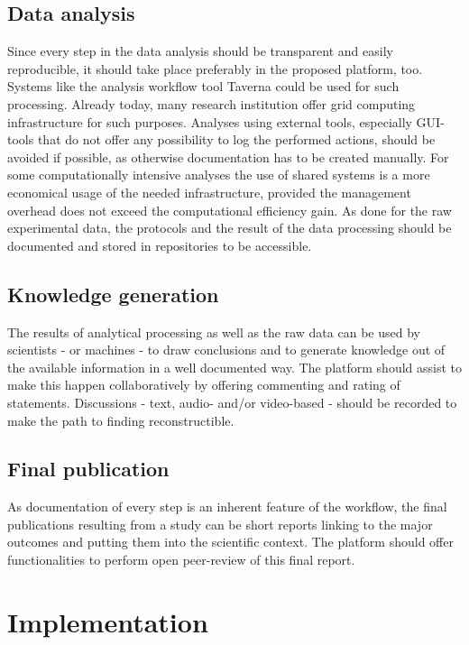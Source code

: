 \documentclass{article}
\begin{document}
\subsection{Data analysis}

Since every step in the data analysis should be transparent and easily
reproducible, it should take place preferably in the proposed
platform, too. Systems like the analysis workflow tool Taverna
\cite{Hull} could be used for such processing. Already today, many
research institution offer grid computing infrastructure for such
purposes. Analyses using external tools, especially GUI-tools that do
not offer any possibility to log the performed actions, should be
avoided if possible, as otherwise documentation has to be created
manually. For some computationally intensive analyses the use of
shared systems is a more economical usage of the needed
infrastructure, provided the management overhead does not exceed the
computational efficiency gain. As done for the raw experimental data,
the protocols and the result of the data processing should be
documented and stored in repositories to be accessible.

\subsection{Knowledge generation}

The results of analytical processing as well as the raw data can be
used by scientists - or machines \cite{Schmidt} - to draw conclusions
and to generate knowledge out of the available information in a well
documented way. The platform should assist to make this happen
collaboratively by offering commenting and rating of
statements. Discussions - text, audio- and/or video-based - should be
recorded to make the path to finding reconstructible.

\subsection{Final publication}

As documentation of every step is an inherent feature of the workflow,
the final publications resulting from a study can be short reports
linking to the major outcomes and putting them into the scientific
context. The platform should offer functionalities to perform open
peer-review of this final report.

\section{Implementation}
\end{document}
